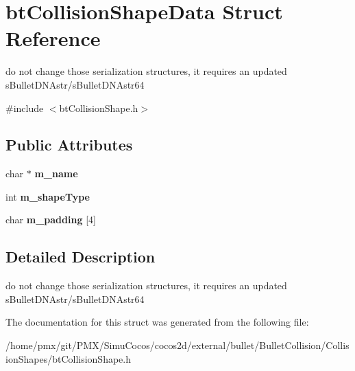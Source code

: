 \hypertarget{structbtCollisionShapeData}{}\section{bt\+Collision\+Shape\+Data Struct Reference}
\label{structbtCollisionShapeData}


do not change those serialization structures, it requires an updated s\+Bullet\+D\+N\+Astr/s\+Bullet\+D\+N\+Astr64  




{\ttfamily \#include $<$bt\+Collision\+Shape.\+h$>$}

\subsection*{Public Attributes}
\begin{DoxyCompactItemize}
\item 
\mbox{\label{structbtCollisionShapeData_a95f6ed40faf0c8ca7535ad4faa71f72a}} 
char $\ast$ {\bfseries m\+\_\+name}
\item 
\mbox{\label{structbtCollisionShapeData_aa163414b23939ed6030fd19cf404b38a}} 
int {\bfseries m\+\_\+shape\+Type}
\item 
\mbox{\label{structbtCollisionShapeData_a64978d6813d6b09cebd1e8b3a828556e}} 
char {\bfseries m\+\_\+padding} \mbox{[}4\mbox{]}
\end{DoxyCompactItemize}


\subsection{Detailed Description}
do not change those serialization structures, it requires an updated s\+Bullet\+D\+N\+Astr/s\+Bullet\+D\+N\+Astr64 

The documentation for this struct was generated from the following file\+:\begin{DoxyCompactItemize}
\item 
/home/pmx/git/\+P\+M\+X/\+Simu\+Cocos/cocos2d/external/bullet/\+Bullet\+Collision/\+Collision\+Shapes/bt\+Collision\+Shape.\+h\end{DoxyCompactItemize}
